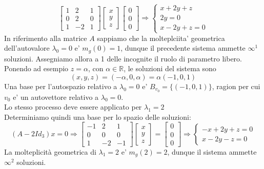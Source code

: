\documentclass[a4paper, 10pt]{article}
\begin{document}
	\[ \begin{bmatrix} 1 & 2 & 1 \\ 0 & 2 & 0 \\ 1 & -2 & 1 \end{bmatrix} 
	\begin{bmatrix} x \\ y \\ z \end{bmatrix} \begin{bmatrix} 0 \\ 0 \\ 0 \end{bmatrix}  \Longrightarrow 
	\begin{cases} x + 2y + z \\ 2y = 0 \\ x - 2y + z = 0 \end{cases} \]
	In riferimento alla matrice $A$ sappiamo che la molteplciita' geometrica dell'autovalore $\lambda_0 = 0$ e' $m_g(0) = 1$,
	dunque il precedente sistema ammette $\infty^1$ soluzioni. Assegniamo allora a 1 delle incognite il ruolo di 
	parametro libero. \\ Ponendo ad esempio $z = \alpha$, con $\alpha \in \mathbb{R}$, le soluzioni del sistema sono
	\[ (x,y,z) = (-\alpha, 0, \alpha) = \alpha(-1,0,1) \]
	Una base per l'autospazio relativo a $\lambda_0 = 0$ e' $B_{v_0} = \lbrace (-1,0,1) \rbrace$, 
	ragion per cui $v_0$ e' un autovettore relativo a $\lambda_0 = 0$. \\
	Lo stesso processo deve essere applicato per $\lambda_1 = 2$\\
	Determiniamo quindi una base per lo spazio delle soluzioni:
	\[(A - 2Id_3) x = 0 \Longrightarrow 
	\begin{bmatrix}-1 & 2 & 1 \\ 0 & 0 & 0 \\ 1 & -2 & -1	\end{bmatrix}\begin{bmatrix} x \\ y \\ z \end{bmatrix} = 
	\begin{bmatrix}0 \\ 0 \\ 0	\end{bmatrix} \Rightarrow \begin{cases} -x + 2y + z = 0 \\ x - 2y - z = 0 \end{cases} \]
	La molteplicità geometrica di $\lambda_1 = 2$ e' $m_g(2) = 2$, dunque il sistema ammette $\infty^2$ soluzioni. 
\end{document}
